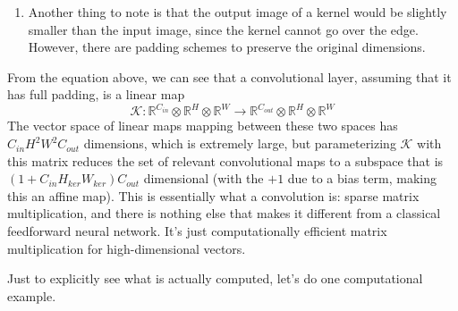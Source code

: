 \begin{definition}
\begin{enumerate}
      \item Another thing to note is that the output image of a kernel would be slightly smaller than the input image, since the kernel cannot go over the edge. However, there are padding schemes to preserve the original dimensions. 
    \end{enumerate}
    From the equation above, we can see that a convolutional layer, assuming that it has full padding, is a linear map  
    \begin{equation}
      \mathcal{K} : \mathbb{R}^{C_{in}} \otimes \mathbb{R}^H \otimes \mathbb{R}^W \rightarrow \mathbb{R}^{C_{out}} \otimes \mathbb{R}^H \otimes \mathbb{R}^W
      \label{eq:conv_mapping}
    \end{equation}
    The vector space of linear maps mapping between these two spaces has $C_{in} H^2 W^2 C_{out}$ dimensions, which is extremely large, but parameterizing $\mathcal{K}$ with this matrix reduces the set of relevant convolutional maps to a subspace that is $(1 + C_{in} H_{ker} W_{ker}) C_{out}$ dimensional (with the $+1$ due to a bias term, making this an affine map). This is essentially what a convolution is: sparse matrix multiplication, and there is nothing else that makes it different from a classical feedforward neural network. It's just computationally efficient matrix multiplication for high-dimensional vectors. 
  \end{definition}

  Just to explicitly see what is actually computed, let's do one computational example. 

